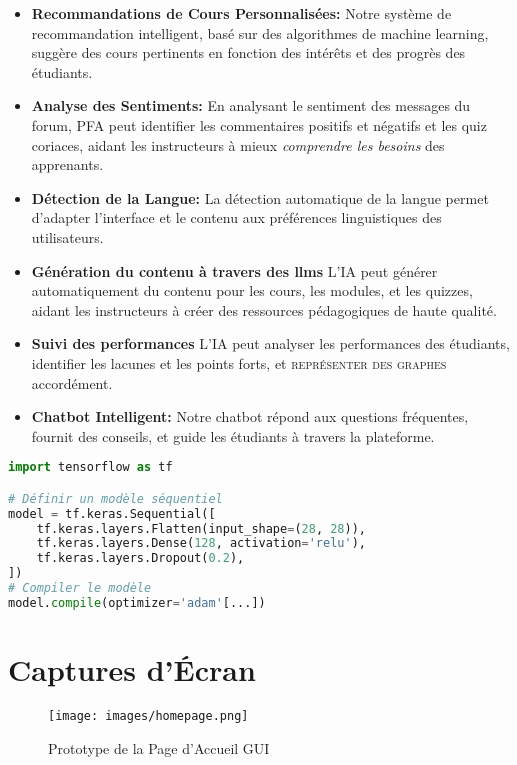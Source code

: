 \begin{itemize}
    \item \textbf{Recommandations de Cours Personnalisées:} Notre système de recommandation intelligent, basé sur des algorithmes de machine learning, suggère des cours pertinents en fonction des intérêts et des progrès des étudiants.
    \item \textbf{Analyse des Sentiments:} En analysant le sentiment des messages du forum, PFA peut identifier les commentaires positifs et négatifs et les quiz coriaces, aidant les instructeurs à mieux \textit{comprendre les besoins} des apprenants.
    \item \textbf{Détection de la Langue:} La détection automatique de la langue permet d'adapter l'interface et le contenu aux préférences linguistiques des utilisateurs.
    \item \textbf{Génération du contenu à travers des \gls{llm}s} L'IA peut générer automatiquement du contenu pour les cours, les modules, et les quizzes, aidant les instructeurs à créer des ressources pédagogiques de haute qualité.
    \item \textbf{Suivi des performances} L'IA peut analyser les performances des étudiants, identifier les lacunes et les points forts, et \textsc{représenter des graphes} accordément.
    \item \textbf{Chatbot Intelligent:} Notre chatbot répond aux questions fréquentes, fournit des conseils, et guide les étudiants à travers la plateforme.
\end{itemize}

\begin{lstlisting}[language=Python, caption={Exemple de Code Python Utilisant TensorFlow}, label={lst:tensorflowexample}, basicstyle=\ttfamily, keywordstyle=\color{blue}, commentstyle=\color{green}, stringstyle=\color{red}]
import tensorflow as tf

# Définir un modèle séquentiel
model = tf.keras.Sequential([
    tf.keras.layers.Flatten(input_shape=(28, 28)),
    tf.keras.layers.Dense(128, activation='relu'),
    tf.keras.layers.Dropout(0.2),
])
# Compiler le modèle
model.compile(optimizer='adam'[...])

\end{lstlisting}

\section{Captures d'Écran}

\begin{figure}[htbp]
    \centering
    \texttt{[image: images/homepage.png]}
    \caption{Prototype de la Page d'Accueil GUI}
    \label{fig:homepage}
\end{figure}


